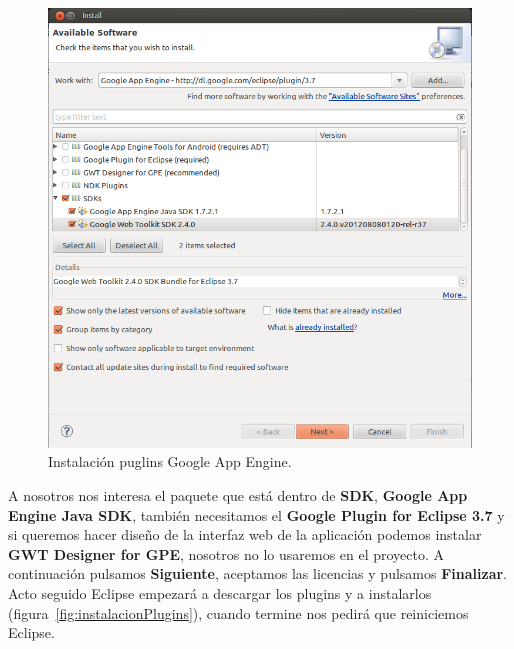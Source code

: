 \begin{figure}[hbt]
  \centering
    \includegraphics[scale=0.6]{./AnexoConfiguracionEclipse/imagenes/instalacionGAE.png}
  \caption{Instalación puglins Google App Engine.}
  \label{fig:instalacionGAE}
\end{figure}

A nosotros nos interesa el paquete que está dentro de \textbf{SDK}, \textbf{Google App Engine Java SDK}, también necesitamos el \textbf{Google Plugin for Eclipse 3.7} y si queremos hacer diseño de la interfaz web de la aplicación podemos instalar \textbf{GWT Designer for GPE}, nosotros no lo usaremos en el proyecto. A continuación pulsamos \textbf{Siguiente}, aceptamos las licencias y pulsamos \textbf{Finalizar}. Acto seguido Eclipse empezará a descargar los plugins y a instalarlos (figura~\ref{fig:instalacionPlugins}), cuando termine nos pedirá que reiniciemos Eclipse.

